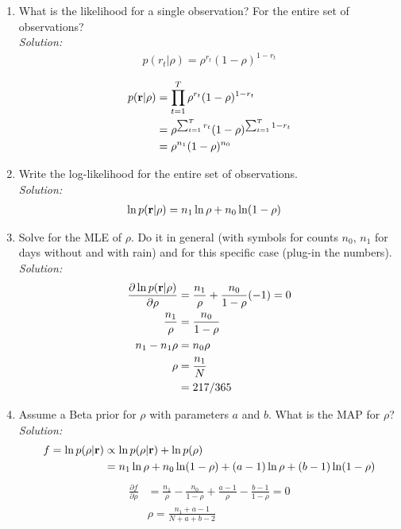 \documentclass[12pt,a4paper]{article}
\newcommand{\rvec}{{\bf r}}
\begin{document}
\begin{enumerate}
  \item What is the likelihood for a single observation?  For the entire set of observations? \\
	  \emph{Solution:} \\
		  \begin{align*}
		  	p(r_t | \rho) = \rho^{r_t} (1 - \rho)^{1 - r_t}
		  \end{align*}
		  
		  \begin{align*}
		  	p(\rvec | \rho) &= \prod_{t = 1}^{T} \rho^{r_t} (1 - \rho)^{1 - r_t} \\
		  	&= \rho^{\sum_{t = 1}^{T} r_t} (1 - \rho)^{\sum_{t = 1}^{T} 1 - r_t} \\
		  	&= \rho^{n_1} (1 - \rho)^{n_0}
		  \end{align*}
  
  
  \item Write the log-likelihood for the entire set of observations.  \\
	  \emph{Solution:} \\
		  \begin{align*}
		  	\ln p(\rvec | \rho) &= n_1 \ln \rho + n_0 \ln (1 - \rho)
		  \end{align*}
  
  \item Solve for the MLE of $\rho$.  Do it in general (with symbols for counts $n_0$, $n_1$ for days without and with rain) and for this specific case (plug-in the numbers).\\
	  \emph{Solution:} \\
		  \begin{align*}
		  	\frac{\partial \ln p(\rvec | \rho)}{\partial \rho} &= \frac{n_1}{\rho} + \frac{n_0}{1 - \rho} (-1) = 0 \\
		  	\frac{n_1}{\rho} &= \frac{n_0}{1 - \rho} \\
		  	n_1 - n_1 \rho &= n_0 \rho \\
		  	\rho &= \frac{n_1}{N} \\
		  	&= 217 / 365
		  \end{align*}
  
  \item Assume a Beta prior for $\rho$ with parameters $a$ and $b$.  What is the MAP for $\rho$? \\
	  \emph{Solution:} \\
		  \begin{align*}
		  	f = \ln p(\rho | \rvec) &\propto \ln p(\rho | \rvec) + \ln p(\rho) \\
		  	&= n_1 \ln \rho + n_0 \ln(1 - \rho) + (a - 1) \ln \rho + (b - 1) \ln(1 - \rho)
		  \end{align*}
		  \begin{align*}
		  	\frac{\partial f}{\partial{\rho}} &= \frac{n_1}{\rho}-\frac{n_0}{1-\rho}+\frac{a -1}{\rho}-\frac{b-1}{1-\rho} = 0\\
		  	&\rho= \frac{n_1 + a -1}{N + a +b -2}
		  \end{align*}
  

\end{enumerate}
\end{document}

